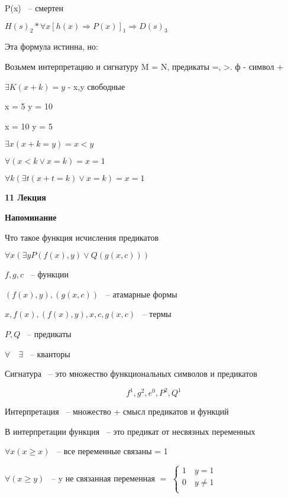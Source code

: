 \documentclass[russian]{lecture-notes}
\begin{document}
    P(x) ~-- смертен

    $H(s)_{2} * \forall x [ h(x) \Rightarrow P(x)  ]_{1} \Rightarrow D(s)_{3}$

    Эта формула истинна, но:

    Возьмем интерпретацию и сигнатуру M = N, предикаты =, >. ф - символ +

    $\exists K (x + k) = y$ - x,y свободные

    x = 5 \qquad y = 10 

    x = 10 \qquad y = 5 

    $\exists x (x+k=y) = x <y$

    $\forall (x < k \lor x = k) = x = 1$

    $\forall k (\exists t(x+t=k) \lor x = k) =x = 1 $

    \textbf{11 Лекция}

    \textbf{Напоминание}

    Что такое функция исчисления предикатов

    $\forall x (\exists y P(f(x), y) \lor Q(g(x, c)))$

    $f, g, c$ ~-- функции

    $(f(x), y), (g(x, c))$ ~-- атамарные формы

    $x, f(x), (f(x),y), x, c, g(x, c)$ ~-- термы

    $P, Q$ ~-- предикаты

    $\forall \quad \exists$ ~-- кванторы

    \begin{definition}
        Сигнатура ~-- это множество функциональных символов и предикатов

        $${ f^1, g^2, e^0, P^2, Q^1}$$
    \end{definition}

    \begin{definition}
        Интерпретация ~-- множество + смысл предикатов и функций
    \end{definition}

    В интерпретации функция ~-- это предикат от несвязных переменных


    $\forall x (x \geq x)$ ~-- все переменные связаны = 1

    $\forall (x \geq y)$ ~-- y не связанная переменная $=$
    $\left \{
    \begin{gathered}
        1 \quad y = 1  \\
        0 \quad y \neq 1 \\
    \end{gathered}
    \right.$
\end{document}
